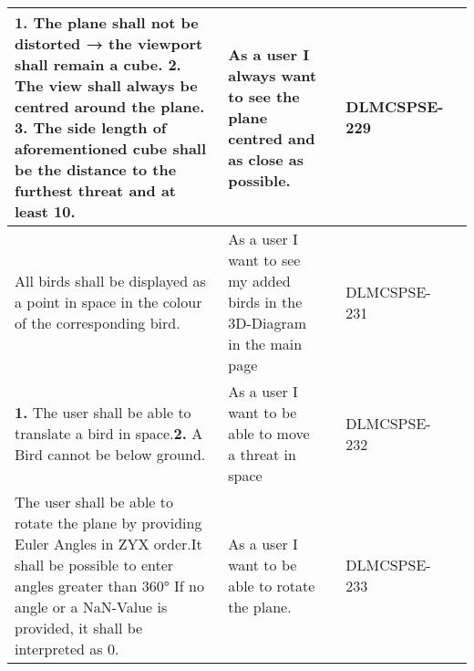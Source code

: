 \begin{xltabular}{\textwidth}{|X|X|M{1.8cm}|M{1.3cm}|M{1.3cm}|}
  \textbf{1.} The plane shall not be distorted → the viewport shall remain a cube. \newline\newline \textbf{2.} The view shall always be centred around the plane. \newline\newline \textbf{3.} The side length of aforementioned cube shall be the distance to the furthest threat and at least 10. & As a user I always want to see the plane centred and as close as possible. &  & {\color{purpleT}\ttfamily DLMCSPSE-229} &  \\ \hline 
  All birds shall be displayed as a point in space in the colour of the corresponding bird. & As a user I want to see my added birds in the 3D-Diagram in the main page &  & {\color{purpleT}\ttfamily DLMCSPSE-231} &  \\ \hline 
  \textbf{1.} The user shall be able to translate a bird in space.\newline\newline \textbf{2.} A Bird cannot be below ground. & As a user I want to be able to move a threat in space &  & {\color{purpleT}\ttfamily DLMCSPSE-232} &  \\ \hline 
  The user shall be able to rotate the plane by providing Euler Angles in ZYX order.\newline \newline It shall be possible to enter angles greater than 360° \newline \newline If no angle or a NaN-Value is provided, it shall be interpreted as 0. & As a user I want to be able to rotate the plane. &  & {\color{purpleT}\ttfamily DLMCSPSE-233} &  \\ \hline 

\end{xltabular}
